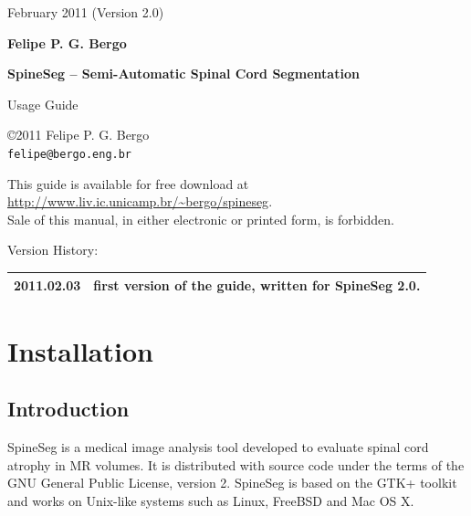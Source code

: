 \documentclass[12pt]{report}
\begin{document}
\vspace{1in}

{\large\sffamily February 2011 (Version 2.0)} 

{\Large\sffamily\bfseries Felipe P. G. Bergo} 

\newpage
\pagestyle{empty}

{\Large\sffamily\bfseries SpineSeg -- \mdseries Semi-Automatic Spinal Cord Segmentation}

{\Large Usage Guide}

\vspace{3cm}

\copyright 2011 Felipe P. G. Bergo\\

\texttt{felipe@bergo.eng.br} \\

\vspace{1cm}

This guide is available for free download at \\
\url{http://www.liv.ic.unicamp.br/~bergo/spineseg}. \\ 
Sale of this manual, in either electronic or printed form, is forbidden.

\vspace{3cm}

Version History: \\

\begin{tabular}{|l|p{3.5in}|}
\hline
2011.02.03 & first version of the guide, written for SpineSeg 2.0. \\
\hline
\end{tabular}

\newpage
\tableofcontents
\pagestyle{fancy}
\chead{}
\rhead{}
\lfoot{}
\cfoot{\thepage}
\rfoot{}
\renewcommand{\headrulewidth}{0.4pt}
\renewcommand{\footrulewidth}{0.4pt}

\chapter{Installation}
\label{c.install}

\section{Introduction}

SpineSeg is a medical image analysis tool developed to evaluate spinal
cord atrophy in MR volumes. It is distributed with source code under
the terms of the GNU General Public License, version 2. SpineSeg is
based on the GTK+ toolkit and works on Unix-like systems such as
Linux, FreeBSD and Mac OS X.
\end{document}
